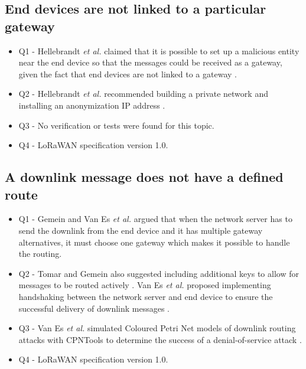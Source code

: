 \documentclass[manuscript,screen,review=false]{acmart}
\begin{document}
\subsection{End devices are not linked to a particular gateway}

\begin{itemize}
\item Q1 - Hellebrandt {\it et al.} claimed that it is possible to set up a malicious entity near the end device so that the messages could be received as a gateway, given the fact that end devices are not linked to a gateway \cite{16_privacy_ioT_networks}.

\item Q2 - Hellebrandt {\it et al.} recommended building a private network and installing an anonymization IP address \cite{16_privacy_ioT_networks}.

\item Q3 - No verification or tests were found for this topic.

\item Q4 - LoRaWAN specification version 1.0.
\end{itemize}

\subsection{A downlink message does not have a defined route}

\begin{itemize}
\item Q1 - Gemein \cite{23_lora_secure_design} and Van Es {\it et al.} \cite{92_DoS_lorawan} argued that when the network server has to send the downlink from the end device and it has multiple gateway alternatives, it must choose one gateway which makes it possible to handle the routing.

\item Q2 - Tomar and Gemein also suggested including additional keys to allow for messages to be routed actively \cite{23_lora_secure_design}. Van Es {\it et al.} proposed implementing handshaking between the network server and end device to ensure the successful delivery of downlink messages \cite{92_DoS_lorawan}.

\item Q3 - Van Es {\it et al.} simulated Coloured Petri Net models of downlink routing attacks with CPNTools to determine the success of a denial-of-service attack \cite{92_DoS_lorawan}.

\item Q4 - LoRaWAN specification version 1.0.
\end{itemize}
\end{document}
